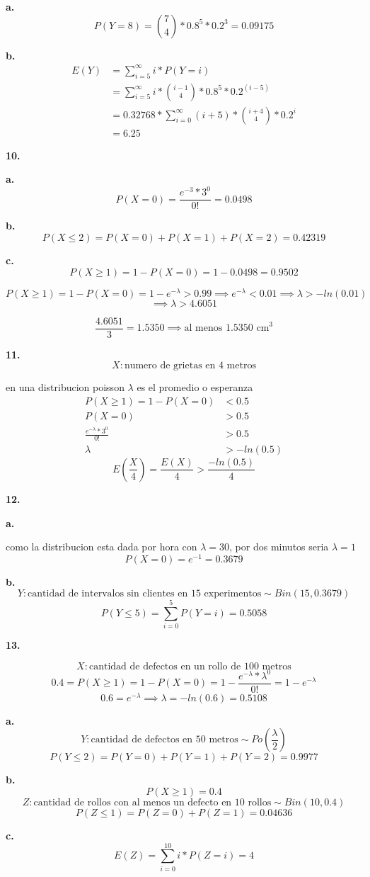 \documentclass[12pt,fleqn]{article}
\begin{document}
\textbf{a.}
\[P(Y=8)=\binom{7}{4}*0.8^5*0.2^3=0.09175\]

\textbf{b.}
\begin{align*}
  E(Y)&=\sum_{i=5}^{\infty} i*P(Y=i)\\
      &=\sum_{i=5}^{\infty} i*\binom{i-1}{4}*0.8^5*0.2^{(i-5)}\\
      &=0.32768*\sum_{i=0}^{\infty} (i+5)*\binom{i+4}{4}*0.2^i\\
      &=6.25
\end{align*}

\textbf{10.}

\textbf{a.}
\[P(X=0)=\frac{e^{-3}*3^0}{0!}=0.0498\]

\textbf{b.}
\[P(X \le 2)=P(X=0)+P(X=1)+P(X=2)=0.42319\]

\textbf{c.}
\[P(X \ge 1)=1-P(X=0)=1-0.0498=0.9502\]

\[P(X \ge 1)=1-P(X=0)=1-e^{-\lambda}>0.99 \implies e^{-\lambda}<0.01 \implies \lambda>-ln(0.01)\]
\[\implies \lambda>4.6051\]

\[\frac{4.6051}{3}=1.5350 \implies \textrm{al menos 1.5350 cm}^3\]


\textbf{11.}
\[X: \textrm{numero de grietas en 4 metros}\]

en una distribucion poisson $\lambda$ es el promedio o esperanza
\begin{align*}
  P(X \ge 1)=1-P(X=0)&<0.5\\
  P(X=0)&>0.5\\
  \frac{e^{-\lambda}*3^0}{0!}&>0.5\\
  \lambda&>-ln(0.5)
\end{align*}
\[E(\frac{X}{4})=\frac{E(X)}{4}>\frac{-ln(0.5)}{4}\]

\textbf{12.}

\textbf{a.}

como la distribucion esta dada por hora con $\lambda=30$, por dos minutos seria $\lambda=1$
\[P(X=0)=e^{-1}=0.3679\]

\textbf{b.}
\[Y: \textrm{cantidad de intervalos sin clientes en 15 experimentos} \sim Bin(15,0.3679)\]
\[P(Y \le 5)=\sum_{i=0}^5 P(Y=i)=0.5058\]

\textbf{13.}

\[X: \textrm{cantidad de defectos en un rollo de 100 metros}\]
\[0.4=P(X \ge 1)=1-P(X=0)=1-\frac{e^{-\lambda}*\lambda^0}{0!}=1-e^{-\lambda}\]
\[0.6=e^{-\lambda} \implies \lambda=-ln(0.6)=0.5108\]

\textbf{a.}
\[Y: \textrm{cantidad de defectos en 50 metros} \sim Po(\frac{\lambda}{2})\]
\[P(Y \le 2)=P(Y=0)+P(Y=1)+P(Y=2)=0.9977\]

\textbf{b.}
\[P(X \ge 1)=0.4\]
\[Z: \textrm{cantidad de rollos con al menos un defecto en 10 rollos} \sim Bin(10,0.4)\]
\[P(Z \le 1)=P(Z=0)+P(Z=1)=0.04636\]

\textbf{c.}
\[E(Z)=\sum_{i=0}^{10} i*P(Z=i)=4\]
\end{document}
